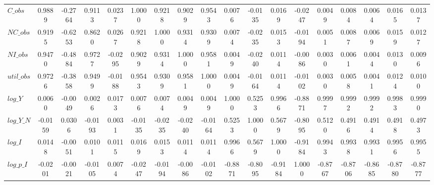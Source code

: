 \begin{center}
\begin{longtable}{lccccccccccccccccc}
$C\_obs     $	 & 	       0.9889	 & 	      -0.2764	 & 	       0.9113	 & 	       0.0237	 & 	       1.0000	 & 	       0.9218	 & 	       0.9029	 & 	       0.9543	 & 	       0.0076	 & 	      -0.0135	 & 	       0.0169	 & 	      -0.0247	 & 	       0.0049	 & 	       0.0084	 & 	       0.0064	 & 	       0.0165	 & 	       0.0137 \\ 
$NC\_obs    $	 & 	       0.9195	 & 	      -0.6253	 & 	       0.8620	 & 	       0.0267	 & 	       0.9218	 & 	       1.0000	 & 	       0.9314	 & 	       0.9309	 & 	       0.0074	 & 	      -0.0235	 & 	       0.0153	 & 	      -0.0194	 & 	       0.0051	 & 	       0.0087	 & 	       0.0069	 & 	       0.0159	 & 	       0.0127 \\ 
$NI\_obs    $	 & 	       0.9470	 & 	      -0.4884	 & 	       0.9727	 & 	      -0.0295	 & 	       0.9029	 & 	       0.9314	 & 	       1.0000	 & 	       0.9581	 & 	       0.0049	 & 	      -0.0240	 & 	       0.0114	 & 	      -0.0086	 & 	       0.0030	 & 	       0.0061	 & 	       0.0044	 & 	       0.0130	 & 	       0.0096 \\ 
$util\_obs  $	 & 	       0.9726	 & 	      -0.3858	 & 	       0.9499	 & 	      -0.0188	 & 	       0.9543	 & 	       0.9309	 & 	       0.9581	 & 	       1.0000	 & 	       0.0049	 & 	      -0.0164	 & 	       0.0114	 & 	      -0.0102	 & 	       0.0030	 & 	       0.0058	 & 	       0.0041	 & 	       0.0124	 & 	       0.0100 \\ 
$log\_Y     $	 & 	       0.0060	 & 	      -0.0049	 & 	       0.0026	 & 	       0.0173	 & 	       0.0076	 & 	       0.0074	 & 	       0.0049	 & 	       0.0049	 & 	       1.0000	 & 	       0.5253	 & 	       0.9966	 & 	      -0.8871	 & 	       0.9997	 & 	       0.9992	 & 	       0.9992	 & 	       0.9983	 & 	       0.9990 \\ 
$log\_Y\_N  $	 & 	      -0.0159	 & 	       0.0306	 & 	      -0.0193	 & 	       0.0031	 & 	      -0.0135	 & 	      -0.0235	 & 	      -0.0240	 & 	      -0.0164	 & 	       0.5253	 & 	       1.0000	 & 	       0.5679	 & 	      -0.8095	 & 	       0.5120	 & 	       0.4916	 & 	       0.4914	 & 	       0.4918	 & 	       0.4973 \\ 
$log\_I     $	 & 	       0.0148	 & 	      -0.0051	 & 	       0.0101	 & 	       0.0115	 & 	       0.0169	 & 	       0.0153	 & 	       0.0114	 & 	       0.0114	 & 	       0.9966	 & 	       0.5679	 & 	       1.0000	 & 	      -0.9184	 & 	       0.9943	 & 	       0.9938	 & 	       0.9931	 & 	       0.9956	 & 	       0.9955 \\ 
$log\_p\_I  $	 & 	      -0.0201	 & 	      -0.0021	 & 	      -0.0105	 & 	       0.0074	 & 	      -0.0247	 & 	      -0.0194	 & 	      -0.0086	 & 	      -0.0102	 & 	      -0.8871	 & 	      -0.8095	 & 	      -0.9184	 & 	       1.0000	 & 	      -0.8767	 & 	      -0.8706	 & 	      -0.8685	 & 	      -0.8780	 & 	      -0.8777 \\ 

\end{longtable}
\end{center}

